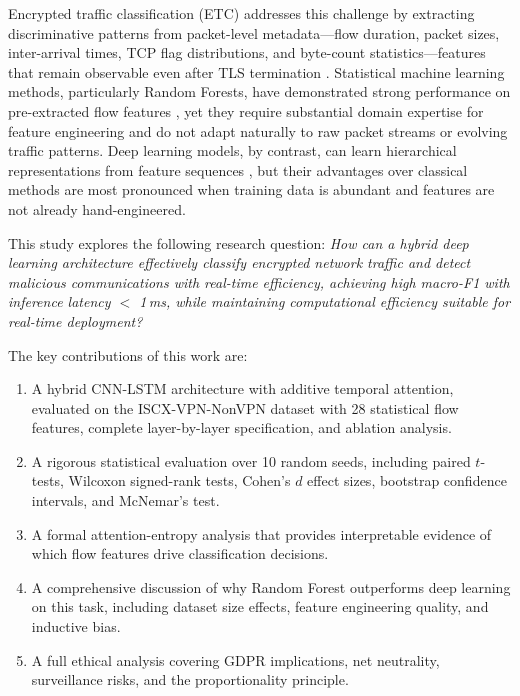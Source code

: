 \documentclass[conference]{IEEEtran}
\begin{document}
Encrypted traffic classification (ETC) addresses this challenge by extracting
discriminative patterns from packet-level metadata---flow duration, packet sizes,
inter-arrival times, TCP flag distributions, and byte-count statistics---features
that remain observable even after TLS termination \cite{draper2016}. Statistical
machine learning methods, particularly Random Forests, have demonstrated strong
performance on pre-extracted flow features
\cite{hayes2016,moore2005}, yet they require substantial domain expertise for
feature engineering and do not adapt naturally to raw packet streams or evolving
traffic patterns. Deep learning models, by contrast, can learn hierarchical
representations from feature sequences \cite{lotfollahi2020,wang2017endtoend},
but their advantages over classical methods are most pronounced when training
data is abundant and features are not already hand-engineered.

This study explores the following research question: \textit{How can a hybrid
deep learning architecture effectively classify encrypted network traffic and
detect malicious communications with real-time efficiency, achieving high macro-F1 with inference latency $<$ 1\,ms, while maintaining computational efficiency suitable for real-time deployment?}

The key contributions of this work are:
\begin{enumerate}
  \item A hybrid CNN-LSTM architecture with additive temporal attention,
        evaluated on the ISCX-VPN-NonVPN dataset with 28 statistical flow features,
        complete layer-by-layer specification, and ablation analysis.
  \item A rigorous statistical evaluation over 10 random seeds, including
        paired $t$-tests, Wilcoxon signed-rank tests, Cohen's $d$ effect sizes,
        bootstrap confidence intervals, and McNemar's test.
  \item A formal attention-entropy analysis that provides interpretable evidence
        of which flow features drive classification decisions.
  \item A comprehensive discussion of why Random Forest outperforms deep
        learning on this task, including dataset size effects, feature
        engineering quality, and inductive bias.
  \item A full ethical analysis covering GDPR implications, net neutrality,
        surveillance risks, and the proportionality principle.
\end{enumerate}
\end{document}
